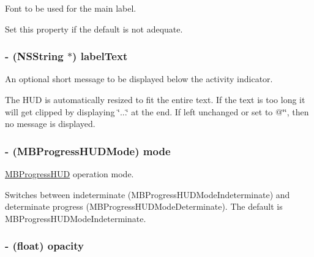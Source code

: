 Font to be used for the main label. 

Set this property if the default is not adequate. \hypertarget{interface_m_b_progress_h_u_d_e43d72850b8dd657db1b383be0566093}{
\subsubsection[{labelText}]{\setlength{\rightskip}{0pt plus 5cm}- (NSString $\ast$) labelText}}
\label{interface_m_b_progress_h_u_d_e43d72850b8dd657db1b383be0566093}


An optional short message to be displayed below the activity indicator. 

The HUD is automatically resized to fit the entire text. If the text is too long it will get clipped by displaying \char`\"{}...\char`\"{} at the end. If left unchanged or set to @\char`\"{}\char`\"{}, then no message is displayed. \hypertarget{interface_m_b_progress_h_u_d_ce77eaaf507e86fe56436f7ee7b6fdc9}{
\subsubsection[{mode}]{\setlength{\rightskip}{0pt plus 5cm}- (MBProgressHUDMode) mode}}
\label{interface_m_b_progress_h_u_d_ce77eaaf507e86fe56436f7ee7b6fdc9}


\hyperlink{interface_m_b_progress_h_u_d}{MBProgressHUD} operation mode. 

Switches between indeterminate (MBProgressHUDModeIndeterminate) and determinate progress (MBProgressHUDModeDeterminate). The default is MBProgressHUDModeIndeterminate. \hypertarget{interface_m_b_progress_h_u_d_24ab5e37917e3489d6add081324a49ff}{
\subsubsection[{opacity}]{\setlength{\rightskip}{0pt plus 5cm}- (float) opacity}}
\label{interface_m_b_progress_h_u_d_24ab5e37917e3489d6add081324a49ff}


